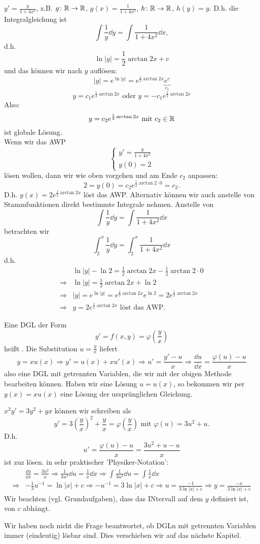 \begin{beispiel}
	$ y'=\frac{y}{1+4x^2} $, z.B. $ g\colon\mathbb{R}\rightarrow\mathbb{R} $, $ g(x)=\frac{1}{1+4x^2} $, $ h\colon\mathbb{R}\rightarrow\mathbb{R} $, $ h(y)=y $. D.h. die Integralgleichung ist
	\[ \int\frac{1}{y}\dd y=\int\frac{1}{1+4x^2}\dd x, \]
	d.h.
	\[ \ln|y|=\frac{1}{2}\arctan 2x + c \]
	und das k\"onnen wir nach $ y $ aufl\"osen:
	\[ |y|=e^{\ln |y|}=e^{\frac{1}{2}\arctan 2x}\underbrace{e^c}_{c_1} \]
	\[ y=c_1e^{\frac{1}{2}\arctan 2x}\text{ oder }y=-c_1e^{\frac{1}{2}\arctan 2x}  \]
	Also:
	\[ y=c_2e^{\frac{1}{2}\arctan 2x}\text{ mit }c_2\in\mathbb{R} \]
	ist globale L\"osung.\\
	Wenn wir das AWP
	\[ \begin{cases}
	y'=\frac{y}{1+4x^2}\\y(0)=2
	\end{cases} \]
	l\"osen wollen, dann wir wie oben vorgehen und am Ende $ c_2 $ anpassen:
	\[ 2=y(0)=c_2e^{\frac{1}{2}\arctan 2\cdot 0}=c_2. \]
	D.h. $ y(x)=2e^{\frac{1}{2}\arctan 2x} $ l\"ost das AWP. Alternativ k\"onnen wir auch anstelle von Stammfunktionen direkt bestimmte Integrale nehmen. Anstelle von
	\[ \int\frac{1}{y}\dd y=\int\frac{1}{1+4x^2}\dd x \]
	betrachten wir
	\[ \int_2^x\frac{1}{y}\dd y=\int_2^x\frac{1}{1+4x^2}\dd x \]
	d.h.
	\begin{align*} &\ln|y|-\ln 2=\frac{1}{2}\arctan 2x-\frac{1}{2}\arctan 2\cdot 0\\
	\Rightarrow&\ln |y|=\frac{1}{2}\arctan 2x+\ln 2\\
	\Rightarrow& |y|=e^{\ln|y|}=e^{\frac{1}{2}\arctan 2x}e^{\ln 2}=2e^{\frac{1}{2}\arctan 2x}\\\Rightarrow&y=2e^{\frac{1}{2}\arctan 2x}\text{ l\"ost das AWP.} \end{align*}
\end{beispiel}
\begin{bemerkung}
	Eine DGL der Form
	\[ y'=f(x,y)=\varphi\left(\frac{y}{x}\right) \]
	hei\ss t . Die Substitution $ u=\frac{y}{x} $ liefert
	\[ y=x u(x)\Rightarrow y'=u(x)+xu'(x)\Rightarrow u'=\frac{y'-u}{x}\Rightarrow \frac{\dd u}{\dd x}=\frac{\varphi(u)-u}{x} \]
	also eine DGL mit getrennten Variablen, die wir mit der obigen Methode bearbeiten k\"onnen. Haben wir eine L\"osung $ u=u(x) $, so bekommen wir per $ y(x)=xu(x) $ eine L\"osung der urspr\"unglichen Gleichung.
\end{bemerkung}
\begin{beispiel}
	$ x^2y'=3y^2+yx $ k\"onnen wir schreiben als
	\[ y'=3\left(\frac{y}{x}\right)^2+\frac{y}{x}=\varphi\left(\frac{y}{x}\right)\text{ mit }\varphi(u)=3u^2+u. \]
	D.h.
	\[ u'=\frac{\varphi(u)-u}{x}=\frac{3u^2+u-u}{x} \]
	ist zuz l\"osen. in sehr praktischer 'Physiker-Notation':
	\begin{align*} &\frac{\dd u}{\dd x}=\frac{3u^2}{x}\Rightarrow\frac{1}{3u^2}\dd u=\frac{1}{x}\dd x\Rightarrow\int\frac{1}{3u^2}\dd u=\int\frac{1}{x}\dd x\\\Rightarrow& -\frac{1}{3}u^{-1}=\ln|x|+c\Rightarrow -u^{-1}=3\ln|x|+c\Rightarrow u=\frac{-1}{3\ln|x|+c}\Rightarrow y=\frac{-x}{3\ln|x|+c} \end{align*} 
	Wir beachten (vgl. Grundaufgaben), dass das INtervall auf dem $ y $ definiert ist, von $ c $ abh\"angt. 
\end{beispiel} 
\begin{bemerkung}
	Wir haben noch nicht die Frage beantwortet, ob DGLn mit getrennten Variablen immer (eindeutig) l\"osbar sind. Dies verschieben wir auf das n\"achste Kapitel.
\end{bemerkung}